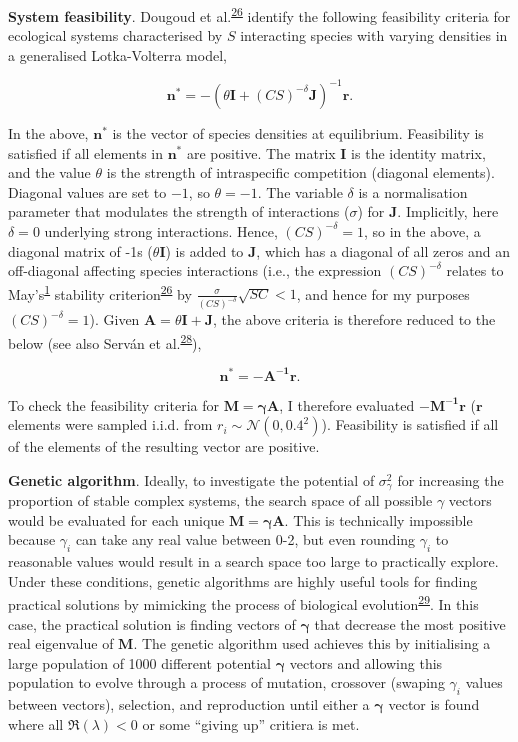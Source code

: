 \documentclass[]{article}
\begin{document}
\textbf{System feasibility}. Dougoud et
al.\textsuperscript{\protect\hyperlink{ref-Dougoud2018}{26}} identify
the following feasibility criteria for ecological systems characterised
by \(S\) interacting species with varying densities in a generalised
Lotka-Volterra model,

\[\mathbf{n^{*}} = -\left(\theta \mathbf{I} + (CS)^{-\delta}\mathbf{J} \right)^{-1}\mathbf{r}.\]

In the above, \(\mathbf{n^{*}}\) is the vector of species densities at
equilibrium. Feasibility is satisfied if all elements in
\(\mathbf{n^{*}}\) are positive. The matrix \(\mathbf{I}\) is the
identity matrix, and the value \(\theta\) is the strength of
intraspecific competition (diagonal elements). Diagonal values are set
to \(-1\), so \(\theta = -1\). The variable \(\delta\) is a
normalisation parameter that modulates the strength of interactions
(\(\sigma\)) for \(\mathbf{J}\). Implicitly, here \(\delta = 0\)
underlying strong interactions. Hence, \((CS)^{-\delta} = 1\), so in the
above, a diagonal matrix of -1s (\(\theta \mathbf{I}\)) is added to
\(\mathbf{J}\), which has a diagonal of all zeros and an off-diagonal
affecting species interactions (i.e., the expression \((CS)^{-\delta}\)
relates to May's\textsuperscript{\protect\hyperlink{ref-May1972}{1}}
stability
criterion\textsuperscript{\protect\hyperlink{ref-Dougoud2018}{26}} by
\(\frac{\sigma}{(CS)^{-\delta}}\sqrt{SC} < 1\), and hence for my
purposes \((CS)^{-\delta} = 1\)). Given
\(\mathbf{A} = \theta\mathbf{I + J}\), the above criteria is therefore
reduced to the below (see also Serván et
al.\textsuperscript{\protect\hyperlink{ref-Servan2018}{28}}),

\[\mathbf{n^{*} = -A^{-1}r}.\]

To check the feasibility criteria for \(\mathbf{M = \gamma A}\), I
therefore evaluated \(\mathbf{-M^{-1}r}\) (\(\mathbf{r}\) elements were
sampled i.i.d. from \(r_{i} \sim \mathcal{N}(0, 0.4^{2})\)). Feasibility
is satisfied if all of the elements of the resulting vector are
positive.

\textbf{Genetic algorithm}. Ideally, to investigate the potential of
\(\sigma^{2}_{\gamma}\) for increasing the proportion of stable complex
systems, the search space of all possible \(\gamma\) vectors would be
evaluated for each unique \(\mathbf{M = \gamma A}\). This is technically
impossible because \(\gamma_{i}\) can take any real value between 0-2,
but even rounding \(\gamma_{i}\) to reasonable values would result in a
search space too large to practically explore. Under these conditions,
genetic algorithms are highly useful tools for finding practical
solutions by mimicking the process of biological
evolution\textsuperscript{\protect\hyperlink{ref-Hamblin2013}{29}}. In
this case, the practical solution is finding vectors of
\(\mathbf{\gamma}\) that decrease the most positive real eigenvalue of
\(\mathbf{M}\). The genetic algorithm used achieves this by initialising
a large population of 1000 different potential \(\mathbf{\gamma}\)
vectors and allowing this population to evolve through a process of
mutation, crossover (swaping \(\gamma_{i}\) values between vectors),
selection, and reproduction until either a \(\mathbf{\gamma}\) vector is
found where all \(\Re(\lambda) < 0\) or some ``giving up'' critiera is
met.
\end{document}
